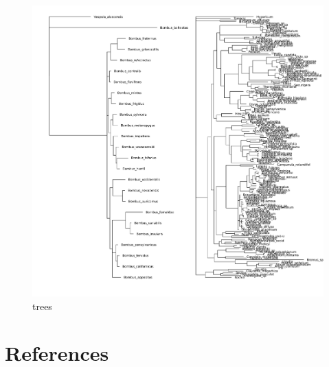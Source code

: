 \documentclass[11pt]{article}
\makeatletter
\def\maxwidth{\ifdim\Gin@nat@width>\linewidth\linewidth
\else\Gin@nat@width\fi}
\let\Oldincludegraphics\includegraphics
\renewcommand{\includegraphics}[1]{\Oldincludegraphics[width=\maxwidth]{#1}}
\makeatother
\begin{document}
\begin{figure}
\centering
\includegraphics{./figures/trees.png}
\caption{trees}
\end{figure}

\hypertarget{references}{%
\section*{References}\label{references}}
\end{document}
